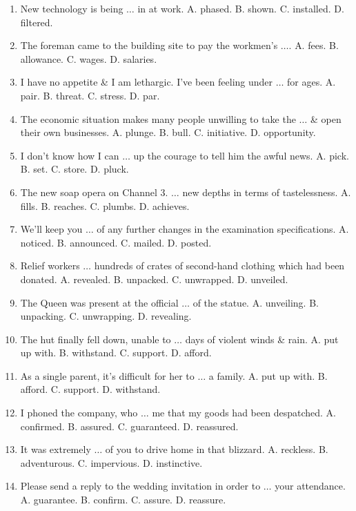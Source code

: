 \documentclass{article}
\numberwithin{equation}{section}
\begin{document}
\begin{enumerate}[leftmargin=8mm]
	\item New technology is being $\ldots$ in at work. {\sf A.} phased. {\sf B.} shown. {\sf C.} installed. {\sf D.} filtered.
	\item The foreman came to the building site to pay the workmen's $\ldots$. {\sf A.} fees. {\sf B.} allowance. {\sf C.} wages. {\sf D.} salaries.
	\item I have no appetite \& I am lethargic. I've been feeling under $\ldots$ for ages. {\sf A.} pair. {\sf B.} threat. {\sf C.} stress. {\sf D.} par.
	\item The economic situation makes many people unwilling to take the $\ldots$ \& open their own businesses. {\sf A.} plunge. {\sf B.} bull. {\sf C.} initiative. {\sf D.} opportunity.
	\item I don't know how I can $\ldots$ up the courage to tell him the awful news. {\sf A.} pick. {\sf B.} set. {\sf C.} store. {\sf D.} pluck.
	\item The new soap opera on Channel 3. $\ldots$ new depths in terms of tastelessness. {\sf A.} fills. {\sf B.} reaches. {\sf C.} plumbs. {\sf D.} achieves.
	\item We'll keep you $\ldots$ of any further changes in the examination specifications. {\sf A.} noticed. {\sf B.} announced. {\sf C.} mailed. {\sf D.} posted.
	\item Relief workers $\ldots$ hundreds of crates of second-hand clothing which had been donated. {\sf A.} revealed. {\sf B.} unpacked. {\sf C.} unwrapped. {\sf D.} unveiled.
	\item The Queen was present at the official $\ldots$ of the statue. {\sf A.} unveiling. {\sf B.} unpacking. {\sf C.} unwrapping. {\sf D.} revealing.
	\item The hut finally fell down, unable to $\ldots$ days of violent winds \& rain. {\sf A.} put up with. {\sf B.} withstand. {\sf C.} support. {\sf D.} afford.
	\item As a single parent, it's difficult for her to $\ldots$ a family. {\sf A.} put up with. {\sf B.} afford. {\sf C.} support. {\sf D.} withstand.
	\item I phoned the company, who $\ldots$ me that my goods had been despatched. {\sf A.} confirmed. {\sf B.} assured. {\sf C.} guaranteed. {\sf D.} reassured.
	\item It was extremely $\ldots$ of you to drive home in that blizzard. {\sf A.} reckless. {\sf B.} adventurous. {\sf C.} impervious. {\sf D.} instinctive.
	\item Please send a reply to the wedding invitation in order to $\ldots$ your attendance. {\sf A.} guarantee. {\sf B.} confirm. {\sf C.} assure. {\sf D.} reassure.

\end{enumerate}
\end{document}
